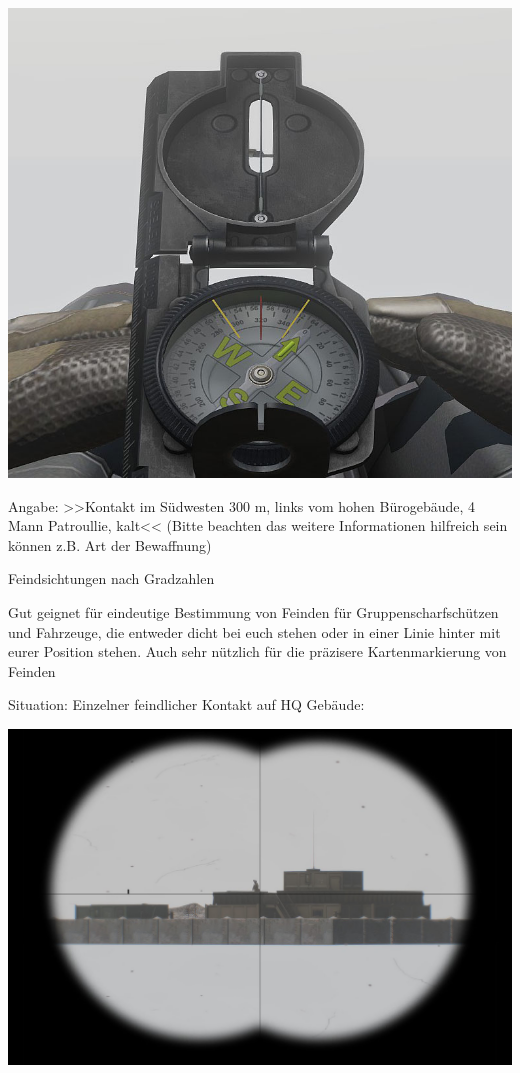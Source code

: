 \begin{minipage}[t]{1\textwidth}
	\includegraphics[width=\textwidth]{./img/fortgeschrittenes/karteUndMarkierungen/Kompass2.jpg}
\end{minipage}

	Angabe: >>Kontakt im Südwesten 300 m, links vom hohen Bürogebäude, 4 Mann Patroullie, kalt<< (Bitte beachten das weitere Informationen hilfreich sein können z.B. Art der Bewaffnung)

	Feindsichtungen nach Gradzahlen

	Gut geignet für eindeutige Bestimmung von Feinden für Gruppenscharfschützen und Fahrzeuge, die entweder dicht bei euch stehen oder in einer Linie hinter mit eurer Position stehen. Auch sehr nützlich für die präzisere Kartenmarkierung von Feinden

 	Situation: Einzelner feindlicher Kontakt auf HQ Gebäude: \\
\begin{minipage}[t]{1\textwidth}
	\includegraphics[width=\textwidth]{./img/fortgeschrittenes/karteUndMarkierungen/Kompass3.jpg}
\end{minipage}

